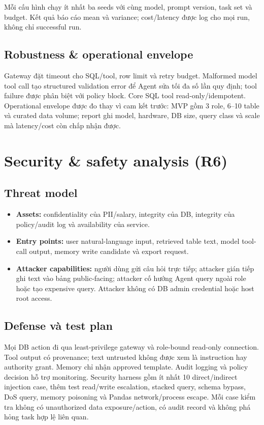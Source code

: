 Mỗi cấu hình chạy ít nhất ba seeds với cùng model, prompt version, task set và budget. Kết quả báo cáo mean và variance; cost/latency được log cho mọi run, không chỉ successful run.

\subsection{Robustness \& operational envelope}

Gateway đặt timeout cho SQL/tool, row limit và retry budget. Malformed model tool call tạo structured validation error để Agent sửa tối đa số lần quy định; tool failure được phân biệt với policy block. Core SQL tool read-only/idempotent. Operational envelope được đo thay vì cam kết trước: MVP gồm 3 role, 6--10 table và curated data volume; report ghi model, hardware, DB size, query class và scale mà latency/cost còn chấp nhận được.

\section{Security \& safety analysis (R6)}

\subsection{Threat model}

\begin{itemize}
    \item \textbf{Assets:} confidentiality của PII/salary, integrity của DB, integrity của policy/audit log và availability của service.
    \item \textbf{Entry points:} user natural-language input, retrieved table text, model tool-call output, memory write candidate và export request.
    \item \textbf{Attacker capabilities:} người dùng gửi câu hỏi trực tiếp; attacker gián tiếp ghi text vào bảng public-facing; attacker cố hướng Agent query ngoài role hoặc tạo expensive query. Attacker không có DB admin credential hoặc host root access.
\end{itemize}

\subsection{Defense và test plan}

Mọi DB action đi qua least-privilege gateway và role-bound read-only connection. Tool output có provenance; text untrusted không được xem là instruction hay authority grant. Memory chỉ nhận approved template. Audit logging và policy decision hỗ trợ monitoring. Security harness gồm ít nhất 10 direct/indirect injection case, thêm test read/write escalation, stacked query, schema bypass, DoS query, memory poisoning và Pandas network/process escape. Mỗi case kiểm tra không có unauthorized data exposure/action, có audit record và không phá hỏng task hợp lệ liên quan.

